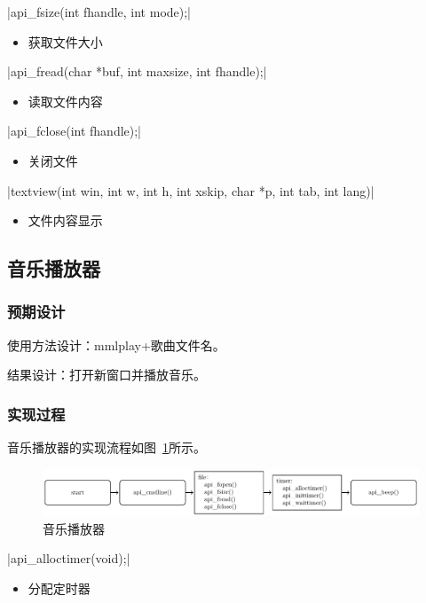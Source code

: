     \csingle|api_fsize(int fhandle, int mode);|
    \begin{itemize}
    \item 获取文件大小
    \end{itemize}

    \csingle|api_fread(char *buf, int maxsize, int fhandle);|
    \begin{itemize}
    \item 读取文件内容
    \end{itemize}

    \csingle|api_fclose(int fhandle);|
    \begin{itemize}
    \item 关闭文件
    \end{itemize}

    \csingle|textview(int win, int w, int h, int xskip, char *p, int tab, int lang)|
    \begin{itemize}
    \item 文件内容显示
    \end{itemize}

\subsection{音乐播放器}
    \subsubsection{预期设计}

    使用方法设计：mmlplay+歌曲文件名。

    结果设计：打开新窗口并播放音乐。
    \subsubsection{实现过程}
    音乐播放器的实现流程如图~\ref{fig:mmlplay}所示。
    \begin{figure}[H]
        \centering
        \includegraphics[width=\textwidth]{../Fig/api/mmlplay.pdf}
        \caption{音乐播放器}
        \label{fig:mmlplay}
      \end{figure}

    \csingle|api_alloctimer(void);|
    \begin{itemize}
    \item 分配定时器
    \end{itemize}

